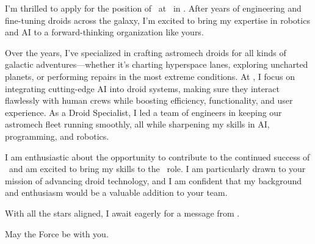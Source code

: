I’m thrilled to apply for the position of \ROLE\ at \COMPANY\ in \CITY. After years of engineering and fine-tuning droids across the galaxy, I’m excited to bring my expertise in robotics and AI to a forward-thinking organization like yours.

Over the years, I’ve specialized in crafting astromech droids for all kinds of galactic adventures—whether it's charting hyperspace lanes, exploring uncharted planets, or performing repairs in the most extreme conditions. At \companyNow, I focus on integrating cutting-edge AI into droid systems, making sure they interact flawlessly with human crews while boosting efficiency, functionality, and user experience. As a Droid Specialist, I led a team of engineers in keeping our astromech fleet running smoothly, all while sharpening my skills in AI, programming, and robotics.

I am enthusiastic about the opportunity to contribute to the continued success of \COMPANY\ and am excited to bring my skills to the \ROLE\ role. I am particularly drawn to your mission of advancing droid technology, and I am confident that my background and enthusiasm would be a valuable addition to your team.

With all the stars aligned, I await eagerly for a message from \COMPANY.

\bigskip

May the Force be with you.